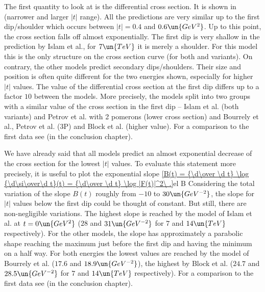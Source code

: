 The first quantity to look at is the differential cross section. It is shown in  (narrower and larger $|t|$ range). All the predictions are very similar up to the first dip/shoulder which occurs between $|t| = 0.4$ and $0.6\un{GeV^2}$. Up to this point, the cross section falls off almost exponentially. The first dip is very shallow in the prediction by Islam et al., for $7\un{TeV}$ it is merely a shoulder. For this model this is the only structure on the cross section curve (for both  and  variants). On contrary, the other models predict secondary dips/shoulders. Their size and position is often quite different for the two energies shown, especially for higher $|t|$ values. The value of the differential cross section at the first dip differs up to a factor $10$ between the models. More precisely, the models split into two groups with a similar value of the cross section in the first dip -- Islam et al. (both variants) and Petrov et al. with 2 pomerons (lower cross section) and Bourrely et al., Petrov et al. (3P) and Block et al. (higher value). For a comparison to the first  data see  (in the conclusion chapter).



We have already said that all models predict an almost exponential decrease of the cross section for the lowest $|t|$ values. To evaluate this statement more precisely, it is useful to plot the exponential slope
\eqref{B(t) = {\d\over \d t} \log {\d\si\over\d t}(t) = {\d\over \d t} \log |F(t)|^2\ .}{el B}
Considering the total variation of the slope $B(t)$ roughly from $-10$ to $30\un{GeV^{-2}}$, the slope for $|t|$ values below the first dip could be thought of constant. But still, there are non-negligible variations. The highest slope is reached by the model of Islam et al. at $t=0\un{GeV^2}$ ($28$ and $31\un{GeV^{-2}}$ for $7$ and $14\un{TeV}$ respectively). For the other models, the slope has approximately a parabolic shape reaching the maximum just before the first dip and having the minimum on a half way. For both energies the lowest values are reached by the model of Bourrely et al. ($17.6$ and $18.9\un{GeV^{-2}}$), the highest by Block et al. ($24.7$ and $28.5\un{GeV^{-2}}$ for $7$ and $14\un{TeV}$ respectively). For a comparison to the first  data see  (in the conclusion chapter).

